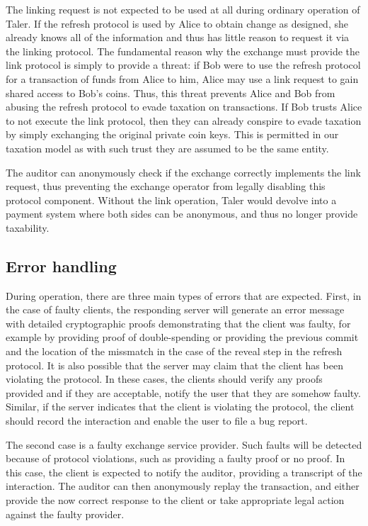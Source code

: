 \documentclass{llncs}
\begin{document}
The linking request is not expected to be used at all during ordinary
operation of Taler.  If the refresh protocol is used by Alice to
obtain change as designed, she already knows all of the information
and thus has little reason to request it via the linking protocol.
The fundamental reason why the exchange must provide the link protocol is
simply to provide a threat: if Bob were to use the refresh protocol
for a transaction of funds from Alice to him, Alice may use a link
request to gain shared access to Bob's coins. Thus, this threat
prevents Alice and Bob from abusing the refresh protocol to evade
taxation on transactions. If Bob trusts Alice to not execute the link
protocol, then they can already conspire to evade taxation by simply
exchanging the original private coin keys.  This is permitted in our
taxation model as with such trust they are assumed to be the same
entity.

The auditor can anonymously check if the exchange correctly implements the
link request, thus preventing the exchange operator from legally disabling
this protocol component.  Without the link operation, Taler would
devolve into a payment system where both sides can be anonymous, and
thus no longer provide taxability.


\subsection{Error handling}

During operation, there are three main types of errors that are
expected.  First, in the case of faulty clients, the responding server
will generate an error message with detailed cryptographic proofs
demonstrating that the client was faulty, for example by providing
proof of double-spending or providing the previous commit and the
location of the missmatch in the case of the reveal step in the
refresh protocol.  It is also possible that the server may claim that
the client has been violating the protocol.  In these cases, the
clients should verify any proofs provided and if they are acceptable,
notify the user that they are somehow faulty.  Similar, if the
server indicates that the client is violating the protocol, the
client should record the interaction and enable the user to file a
bug report.

The second case is a faulty exchange service provider.  Such faults will
be detected because of protocol violations, such as providing
a faulty proof or no proof.  In this case, the client is expected to
notify the auditor, providing a transcript of the interaction.  The
auditor can then anonymously replay the transaction, and either
provide the now correct response to the client or take appropriate
legal action against the faulty provider.
\end{document}
